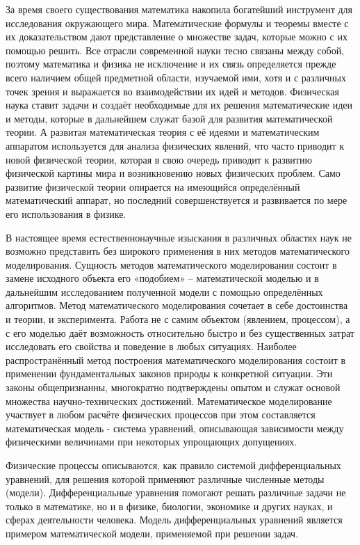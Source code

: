 \documentclass[12pt, a4paper]{extarticle}
\numberwithin{equation}{section}
\begin{document}
За время своего существования математика накопила богатейший инструмент для исследования окружающего мира. Математические формулы и теоремы вместе с их доказательством дают представление о множестве задач, которые можно с их помощью решить. Все отрасли современной науки тесно связаны между собой, поэтому математика и физика не исключение и их связь определяется прежде всего наличием общей предметной области, изучаемой ими, хотя и с различных точек зрения и выражается во взаимодействии их идей и методов. Физическая наука ставит задачи и создаёт необходимые для их решения математические идеи и методы, которые в дальнейшем служат базой для развития математической теории. А развитая математическая теория с её идеями и математическим аппаратом используется для анализа физических явлений, что часто приводит к новой физической теории, которая в свою очередь приводит к развитию физической картины мира и возникновению новых физических проблем. Само развитие физической теории опирается на имеющийся определённый математический аппарат, но последний совершенствуется и развивается по мере его использования в физике.

В настоящее время естественнонаучные изыскания в различных областях наук не возможно представить без широкого применения в них методов математического моделирования. Сущность методов математического моделирования состоит в замене исходного объекта его «подобием» – математической моделью и в дальнейшим исследованием полученной модели с помощью определённых алгоритмов. Метод математического моделирования сочетает в себе достоинства и теории, и эксперимента. Работа не с самим объектом (явлением, процессом), а с его моделью даёт возможность относительно быстро и без существенных затрат исследовать его свойства и поведение в любых ситуациях. Наиболее распространённый метод построения математического моделирования состоит в применении фундаментальных законов природы к конкретной ситуации. Эти законы общепризнанны, многократно подтверждены опытом и служат основой множества научно-технических достижений. Математическое моделирование участвует в любом расчёте физических процессов при этом составляется математическая модель - система уравнений, описывающая зависимости между физическими величинами при некоторых упрощающих допущениях.

Физические процессы описываются, как правило системой дифференциальных уравнений, для решения которой применяют различные численные методы (модели). Дифференциальные уравнения помогают решать различные задачи не только в математике, но и в физике, биологии, экономике и других науках, и сферах деятельности человека. Модель дифференциальных уравнений является примером математической модели, применяемой при решении задач.
\end{document}
